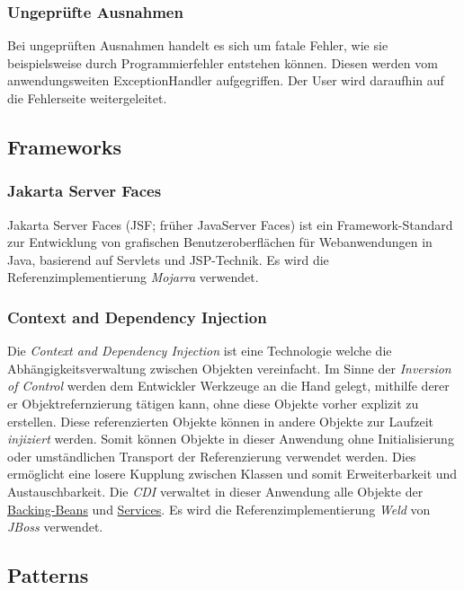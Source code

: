 \subsubsection{Ungeprüfte Ausnahmen}
Bei ungeprüften Ausnahmen handelt es sich um fatale Fehler, wie sie beispielsweise durch
Programmierfehler entstehen können. Diesen werden vom anwendungsweiten
ExceptionHandler %
aufgegriffen. Der User wird daraufhin auf die Fehlerseite %
weitergeleitet.

\subsection{Frameworks}\label{arch:frameworks}

\subsubsection{Jakarta Server Faces}
Jakarta Server Faces (JSF; früher JavaServer Faces) ist ein Framework-Standard zur
Entwicklung von grafischen Benutzeroberflächen für Webanwendungen in Java, basierend auf Servlets und JSP-Technik.
Es wird die Referenzimplementierung \emph{Mojarra} verwendet.

\subsubsection{Context and Dependency Injection}
Die \emph{Context and Dependency Injection} ist eine Technologie welche die
Abhängigkeitsverwaltung zwischen Objekten vereinfacht. Im Sinne der
\emph{Inversion of Control} werden dem Entwickler Werkzeuge an die Hand gelegt, mithilfe derer
er Objektrefernzierung tätigen kann, ohne diese Objekte vorher explizit zu erstellen.
Diese referenzierten Objekte können in andere Objekte zur Laufzeit \emph{injiziert} werden.
Somit können Objekte in dieser Anwendung ohne Initialisierung oder umständlichen Transport der Referenzierung
verwendet werden.
Dies ermöglicht eine losere Kupplung zwischen Klassen und somit Erweiterbarkeit
und Austauschbarkeit.
Die \emph{CDI} verwaltet in dieser Anwendung alle Objekte der \hyperref[arch:backing]{Backing-Beans}
und \hyperref[arch:service]{Services}.
Es wird die Referenzimplementierung \emph{Weld} von \emph{JBoss} verwendet.

\subsection{Patterns}\label{arch:patterns}

